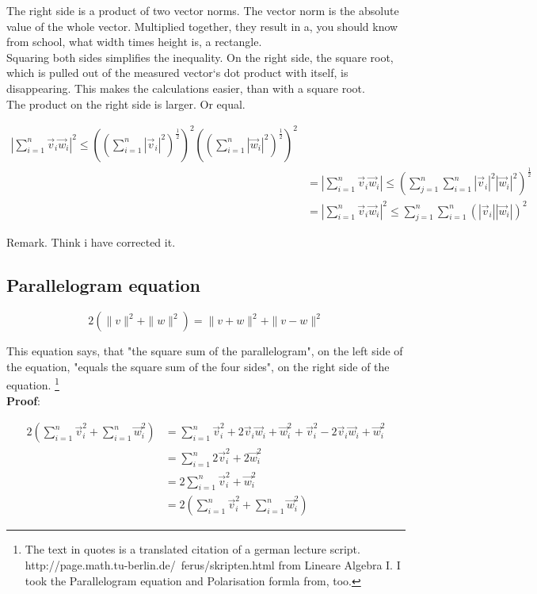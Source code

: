 \documentclass[a4paper]{article}
\begin{document}
The right side is a product of two vector norms. The vector norm is the absolute value of the whole vector. Multiplied together, they result in a, you should know from school, what width times height is, a rectangle. \\

Squaring both sides simplifies the inequality. On the right side, the square root, which is pulled out of the measured vector`s dot product with itself, is disappearing. This makes the calculations easier, than with a square root.\\

The product on the right side is larger. Or equal. 

\begin{displaymath}
\begin{align}    
    |\sum_{i=1}^{n}\vec{v}_{i}\vec{w}_{i}|^{2} \leq ((\sum_{i=1}^{n}|\vec{v}_{i}|^{2})^{\frac{1}{2}})^{2}((\sum_{i=1}^{n}|\vec{w}_{i}|^{2})^{\frac{1}{2}})^{2}\\
    &= |\sum_{i=1}^{n}\vec{v}_{i}\vec{w}_{i}| \leq (\sum_{j=1}^{n}\sum_{i=1}^{n}|\vec{v}_{i}|^{2}|\vec{w}_{i}|^{2})^{\frac{1}{2}}\\
&=
|\sum_{i=1}^{n}\vec{v}_{i}\vec{w}_{i}|^{2} \leq \sum_{j=1}^{n}\sum_{i=1}^{n}(|\vec{v}_{i}||\vec{w}_{i}|)^{2}
\end{align}
\end{displaymath}

Remark. Think i have corrected it.

\subsection{Parallelogram equation}

\begin{displaymath}
2(\|v\|^{2} + \|w\|^{2}) = \|v+w\|^{2}+\|v-w\|^{2}
\end{displaymath}

This equation says, that "the square sum of the parallelogram", on the left side of the equation, "equals the square sum of the four sides", on the right side of the equation. \footnote{The text in quotes is a translated citation of a german lecture script. http://page.math.tu-berlin.de/~ferus/skripten.html from Lineare Algebra I. I took the Parallelogram equation and Polarisation formla from, too.}\\

\textbf{Proof}:

\begin{displaymath}
\begin{align}
2(\sum_{i=1}^{n}\vec{v}_{i}^{2} + \sum_{i=1}^{n}\vec{w}_{i}^{2}) &= \sum_{i=1}^{n}\vec{v}_{i}^{2}+2\vec{v}_{i}\vec{w}_{i}+\vec{w}_{i}^{2}+\vec{v}_{i}^{2}-2\vec{v}_{i}\vec{w}_{i}+\vec{w}_{i}^{2}\\
&= \sum_{i=1}^{n}2\vec{v}_{i}^{2}+2\vec{w}_{i}^2\\ 
&= 2\sum_{i=1}^{n}\vec{v}_{i}^{2}+\vec{w}_{i}^{2} \\
&= 2(\sum_{i=1}^{n}\vec{v}_{i}^{2} + \sum_{i=1}^{n}\vec{w}_{i}^{2})
\end{align}
\end{displaymath}
\end{document}
